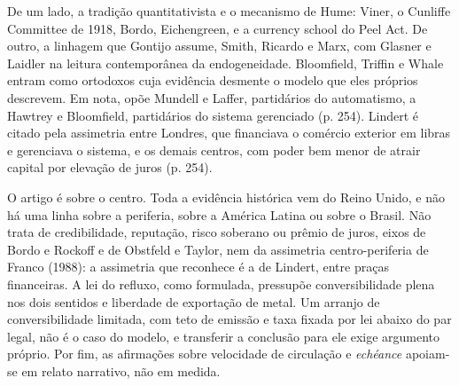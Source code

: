 De um lado, a tradição quantitativista e o mecanismo de Hume: Viner, o Cunliffe
Committee de 1918, Bordo, Eichengreen, e a currency school do Peel Act. De outro,
a linhagem que Gontijo assume, Smith, Ricardo e Marx, com Glasner e Laidler na
leitura contemporânea da endogeneidade. Bloomfield, Triffin e Whale entram como
ortodoxos cuja evidência desmente o modelo que eles próprios descrevem. Em nota,
opõe Mundell e Laffer, partidários do automatismo, a Hawtrey e Bloomfield,
partidários do sistema gerenciado (p. 254). Lindert é citado pela assimetria
entre Londres, que financiava o comércio exterior em libras e gerenciava o
sistema, e os demais centros, com poder bem menor de atrair capital por elevação
de juros (p. 254).

O artigo é sobre o centro. Toda a evidência histórica vem do Reino Unido, e não há
uma linha sobre a periferia, sobre a América Latina ou sobre o Brasil. Não trata
de credibilidade, reputação, risco soberano ou prêmio de juros, eixos de Bordo e
Rockoff e de Obstfeld e Taylor, nem da assimetria centro-periferia de Franco
(1988): a assimetria que reconhece é a de Lindert, entre praças financeiras. A lei
do refluxo, como formulada, pressupõe conversibilidade plena nos dois sentidos e
liberdade de exportação de metal. Um arranjo de conversibilidade limitada, com
teto de emissão e taxa fixada por lei abaixo do par legal, não é o caso do
modelo, e transferir a conclusão para ele exige argumento próprio. Por fim, as
afirmações sobre velocidade de circulação e \emph{echéance} apoiam-se em relato
narrativo, não em medida.

